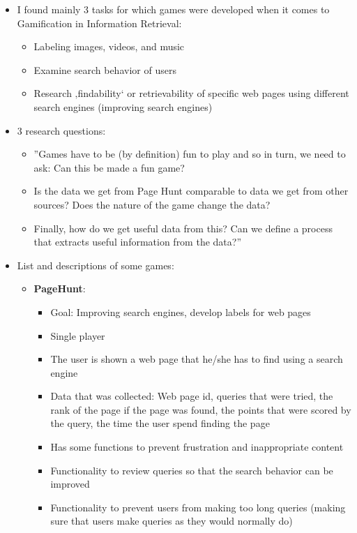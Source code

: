 \documentclass{article}
\theoremstyle{definition}
\theoremstyle{remark}
\begin{document}
\begin{itemize}
    \item  I found mainly 3 tasks for which games were developed when it comes to Gamification in Information Retrieval: 
    \begin{itemize}
        \item Labeling images, videos, and music
        \item Examine search behavior of users
        \item Research ‚findability‘ or retrievability of specific web pages using different search engines (improving search engines)
    \end{itemize}
    \item 3 research questions: 
    \begin{itemize}
        \item ''Games have to be (by definition) fun to play and so in turn, we need to ask: Can this be made a fun game?
        \item Is the data we get from Page Hunt comparable to data we get from other sources? Does the nature of the game change the data?
        \item Finally, how do we get useful data from this? Can we define a process that extracts useful information from the data?'' \cite{search_engines}
    \end{itemize}
    \item List and descriptions of some games:
    \begin{itemize}
        \item \textbf{PageHunt}: \cite{search_engines}
        \begin{itemize}
            \item Goal: Improving search engines, develop labels for web pages
            \item Single player
            \item The user is shown a web page that he/she has to find using a search engine
            \item Data that was collected: Web page id, queries that were tried, the rank of the page if the page was found, the points that were scored by the query, the time the user spend finding the page
            \item Has some functions to prevent frustration and inappropriate content
            \item Functionality to review queries so that the search behavior can be improved
            \item Functionality to prevent users from making too long queries (making sure that users make queries as they would normally do)

\end{itemize}
\end{itemize}
\end{itemize}
\end{document}
